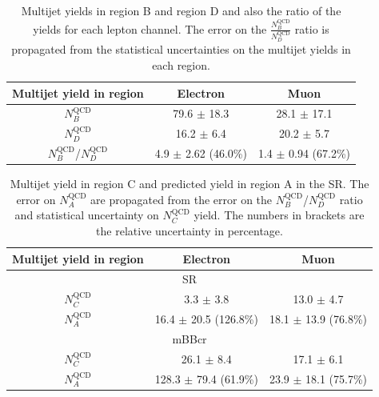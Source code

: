 \begin{table}
\begin{center}
\begin{tabular}{c|c|c}
Multijet yield in region              & Electron                & Muon   \\      
\hline
$N_B^\text{QCD}$                      & 79.6 $\pm$ 18.3      & 28.1 $\pm$ 17.1 \\
$N_D^\text{QCD}$                      & 16.2 $\pm$ 6.4      & 20.2 $\pm$ 5.7  \\
\hline
$N_{B}^\text{QCD}$/$N_{D}^\text{QCD}$     & 4.9 $\pm$ 2.62 (46.0\%) & 1.4 $\pm$ 0.94 (67.2\%)   \\
\end{tabular}
\end{center}
\caption{Multijet yields in region B and region D and also the ratio of the yields for each lepton channel. The error
on the $\frac{N_B^\text{QCD}}{N_D^\text{QCD}}$ ratio is propagated from the statistical uncertainties on the multijet yields in each region.}
\label{tab:boosted_bkgd_abcd_ratio_new}
\end{table}

\begin{table}[!htbp]
\begin{center}
\begin{tabular}{c|c|c}
Multijet yield in region & Electron  & Muon  \\  
\hline
\multicolumn{3}{c}{SR} \\
\hline
$N_C^\text{QCD}$         & 3.3  $\pm$ 3.8 & 13.0 $\pm$ 4.7 \\
$N_A^\text{QCD}$         & 16.4 $\pm$ 20.5 (126.8\%) & 18.1 $\pm$ 13.9 (76.8\%) \\
\hline
\multicolumn{3}{c}{mBBcr} \\
\hline
$N_C^\text{QCD}$       & 26.1  $\pm$ 8.4 & 17.1  $\pm$ 6.1  \\
$N_A^\text{QCD}$       & 128.3 $\pm$ 79.4 (61.9\%) & 23.9 $\pm$ 18.1 (75.7\%)  \\
\hline
\end{tabular}
\end{center}
\caption{Multijet yield in region C and predicted yield in region A in the SR. The error on $N_A^\text{QCD}$
are propagated from the error on the $N_B^\text{QCD}$/$N_D^\text{QCD}$ ratio and statistical uncertainty on $N_C^\text{QCD}$ yield.
The numbers in brackets are the relative uncertainty in percentage.}
\label{tab:boosted_bkgd_abcd_yield_new}
\end{table}


